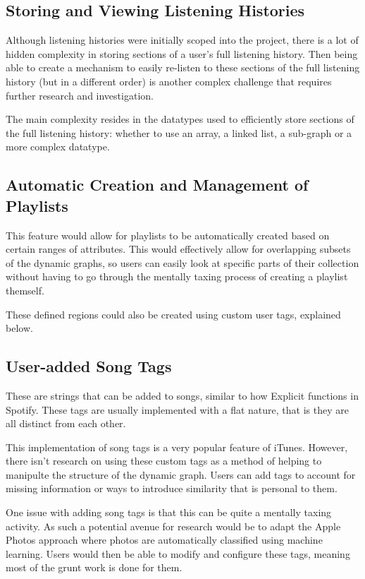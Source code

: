 \subsection{Storing and Viewing Listening Histories}
Although listening histories were initially scoped into the project, there is a lot of hidden complexity in storing sections of a user's full listening history. Then being able to create a mechanism to easily re-listen to these sections of the full listening history (but in a different order) is another complex challenge that requires further research and investigation.

The main complexity resides in the datatypes used to efficiently store sections of the full listening history: whether to use an array, a linked list, a sub-graph or a more complex datatype.

\subsection{Automatic Creation and Management of Playlists}
This feature would allow for playlists to be automatically created based on certain ranges of attributes. This would effectively allow for overlapping subsets of the dynamic graphs, so users can easily look at specific parts of their collection without having to go through the mentally taxing process of creating a playlist themself.

These defined regions could also be created using custom user tags, explained below.

\subsection{User-added Song Tags}
These are strings that can be added to songs, similar to how Explicit functions in Spotify. These tags are usually implemented with a flat nature, that is they are all distinct from each other.

This implementation of song tags is a very popular feature of iTunes. However, there isn't research on using these custom tags as a method of helping to manipulte the structure of the dynamic graph. Users can add tags to account for missing information or ways to introduce similarity that is personal to them.

One issue with adding song tags is that this can be quite a mentally taxing activity. As such a potential avenue for research would be to adapt the Apple Photos approach where photos are automatically classified using machine learning. Users would then be able to modify and configure these tags, meaning most of the grunt work is done for them.

